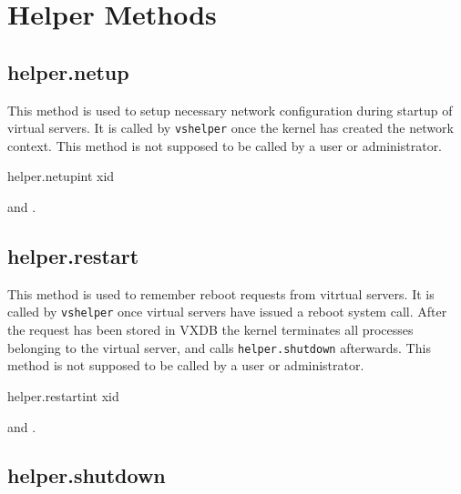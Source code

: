\chapter{Helper Methods}
\label{ch:rpcref:helper}


\section{helper.netup}

This method is used to setup necessary network configuration during startup of
virtual servers. It is called by \texttt{vshelper} once the kernel has created
the network context. This method is not supposed to be called by a user or
administrator.

\begin{rpcsynopsis}{helper.netup}{int xid}
\end{rpcsynopsis}

\begin{rpcaccess}
 and \rpcnoownerchecks.
\end{rpcaccess}

\rpcreturnnil

\rpcnoerrors


\section{helper.restart}

This method is used to remember reboot requests from vitrtual servers. It is
called by \texttt{vshelper} once virtual servers have issued a reboot system
call. After the request has been stored in VXDB the kernel terminates all
processes belonging to the virtual server, and calls \texttt{helper.shutdown}
afterwards.  This method is not supposed to be called by a user or
administrator.

\begin{rpcsynopsis}{helper.restart}{int xid}
\end{rpcsynopsis}

\begin{rpcaccess}
 and \rpcnoownerchecks.
\end{rpcaccess}

\rpcreturnnil

\rpcnoerrors


\section{helper.shutdown}

